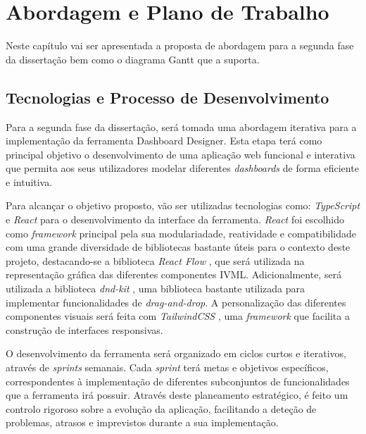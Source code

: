
%

\chapter{Abordagem e Plano de Trabalho}
\label{cha:abordagem_plano}

Neste capítulo vai ser apresentada a proposta de abordagem para a segunda fase da dissertação bem como o diagrama Gantt que a suporta. 

\section{Tecnologias e Processo de Desenvolvimento} %
\label{sec:tecnologias_processo}

Para a segunda fase da dissertação, será tomada uma abordagem iterativa para a implementação da ferramenta Dashboard Designer. Esta etapa terá como principal objetivo o desenvolvimento de uma aplicação web funcional e interativa que permita aos seus utilizadores modelar diferentes \textit{dashboards} de forma eficiente e intuitiva.

Para alcançar o objetivo proposto, vão ser utilizadas tecnologias como: \textit{TypeScript} \cite{typescript} e \textit{React} \cite{react} para o desenvolvimento da interface da ferramenta. \textit{React} foi escolhido como \textit{framework} principal pela sua modulariadade, reatividade e compatibilidade com uma grande diversidade de bibliotecas bastante úteis para o contexto deste projeto, destacando-se a biblioteca \textit{React Flow} \cite{reactflow}, que será utilizada na representação gráfica das diferentes componentes \gls{IVML}. Adicionalmente, será utilizada a biblioteca \textit{dnd-kit} \cite{dndkit}, uma biblioteca bastante utilizada para implementar funcionalidades de \textit{drag-and-drop}. A personalização das diferentes componentes visuais será feita com \textit{TailwindCSS} \cite{tailwindcss}, uma \textit{framework} que facilita a construção de interfaces responsivas.

O desenvolvimento da ferramenta será organizado em ciclos curtos e iterativos, através de \textit{sprints} semanais. Cada \textit{sprint} terá metas e objetivos específicos, correspondentes à implementação de diferentes subconjuntos de funcionalidades que a ferramenta irá possuir. Através deste planeamento estratégico, é feito um controlo rigoroso sobre a evolução da aplicação, facilitando a deteção de problemas, atrasos e imprevistos durante a sua implementação.

